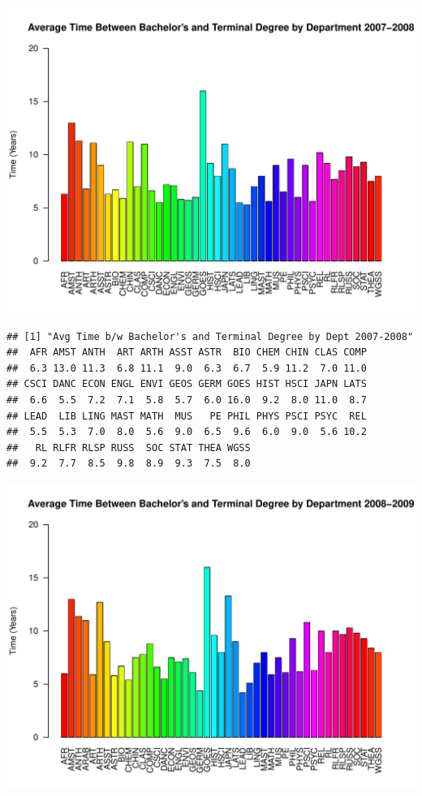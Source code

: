 \documentclass[12pt,a4paper]{article}\usepackage[]{graphicx}\usepackage[]{color}
\makeatletter
\def\maxwidth{ %
  \ifdim\Gin@nat@width>\linewidth
    \linewidth
  \else
    \Gin@nat@width
  \fi
}
\newenvironment{kframe}{%
 \def\at@end@of@kframe{}%
 \ifinner\ifhmode%
  \def\at@end@of@kframe{\end{minipage}}%
  \begin{minipage}{\columnwidth}%
 \fi\fi%
 \def\FrameCommand##1{\hskip\@totalleftmargin \hskip-\fboxsep
 \colorbox{shadecolor}{##1}\hskip-\fboxsep
     \hskip-\linewidth \hskip-\@totalleftmargin \hskip\columnwidth}%
 \MakeFramed {\advance\hsize-\width
   \@totalleftmargin\z@ \linewidth\hsize
   \@setminipage}}%
 {\par\unskip\endMakeFramed%
 \at@end@of@kframe}
\newenvironment{knitrout}{}{} %
\theoremstyle{definition}
\makeatother
\begin{document}
\begin{knitrout}
\includegraphics[width=\maxwidth]{figure/unnamed-chunk-13-4} 
\begin{kframe}\begin{verbatim}
## [1] "Avg Time b/w Bachelor's and Terminal Degree by Dept 2007-2008"
##  AFR AMST ANTH  ART ARTH ASST ASTR  BIO CHEM CHIN CLAS COMP 
##  6.3 13.0 11.3  6.8 11.1  9.0  6.3  6.7  5.9 11.2  7.0 11.0 
## CSCI DANC ECON ENGL ENVI GEOS GERM GOES HIST HSCI JAPN LATS 
##  6.6  5.5  7.2  7.1  5.8  5.7  6.0 16.0  9.2  8.0 11.0  8.7 
## LEAD  LIB LING MAST MATH  MUS   PE PHIL PHYS PSCI PSYC  REL 
##  5.5  5.3  7.0  8.0  5.6  9.0  6.5  9.6  6.0  9.0  5.6 10.2 
##   RL RLFR RLSP RUSS  SOC STAT THEA WGSS 
##  9.2  7.7  8.5  9.8  8.9  9.3  7.5  8.0
\end{verbatim}
\end{kframe}
\includegraphics[width=\maxwidth]{figure/unnamed-chunk-13-5} 

\end{knitrout}
\end{document}
